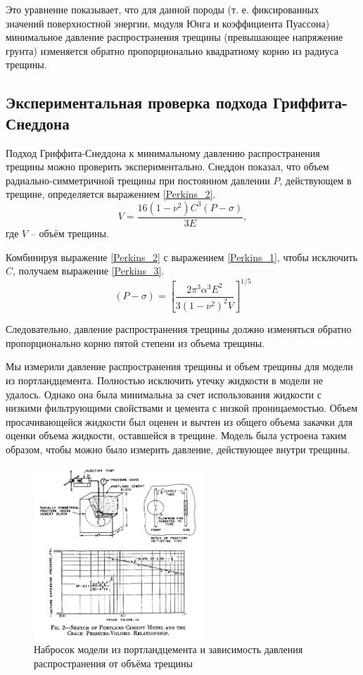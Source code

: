 \documentclass[a4paper, 12pt]{article}
\newcommand{\beq}{\begin{equation}}
\newcommand{\eeq}{\end{equation}}
\begin{document}
Это уравнение показывает, что для данной породы (т. е. фиксированных значений поверхностной энергии, модуля Юнга и коэффициента Пуассона) минимальное давление распространения трещины (превышающее напряжение грунта) изменяется обратно пропорционально квадратному корню из радиуса трещины.

\subsection{Экспериментальная проверка подхода Гриффита-Снеддона}

Подход Гриффита-Снеддона к минимальному давлению распространения трещины можно проверить экспериментально.
Снеддон показал, что объем радиально-симметричной трещины при постоянном давлении $P$, действующем в трещине, определяется выражением \eqref{Perkins_2}.
\beq\label{Perkins_2}
V=\frac{16\left(1-\nu^2\right)C^3\left(P-\sigma\right)}{3E},
\tag{2}
\eeq
где $V$ -- объём трещины.

Комбинируя выражение \eqref{Perkins_2} с выражением \eqref{Perkins_1}, чтобы исключить $C$, получаем выражение \eqref{Perkins_3}.
\beq\label{Perkins_3}
\left(P-\sigma\right)=\left[\frac{2\pi^3\alpha^3E^2}{3\left(1-\nu^2\right)^2V}\right]^{1/5}
\tag{3}
\eeq

Следовательно, давление распространения трещины должно изменяться обратно пропорционально корню пятой степени из объема трещины.

Мы измерили давление распространения трещины и объем трещины для модели из портландцемента.
Полностью исключить утечку жидкости в модели не удалось.
Однако она была минимальна за счет использования жидкости с низкими фильтрующими свойствами и цемента с низкой проницаемостью.
Объем просачивающейся жидкости был оценен и вычтен из общего объема закачки для оценки объема жидкости, оставшейся в трещине.
Модель была устроена таким образом, чтобы можно было измерить давление, действующее внутри трещины.

\begin{figure}[H]
\center
\includegraphics[width=0.57\textwidth]{Perkins_2}
\caption{Набросок модели из портландцемента и зависимость давления распространения от объёма трещины}
\label{fig:Perkins2}
\end{figure}
\end{document}
